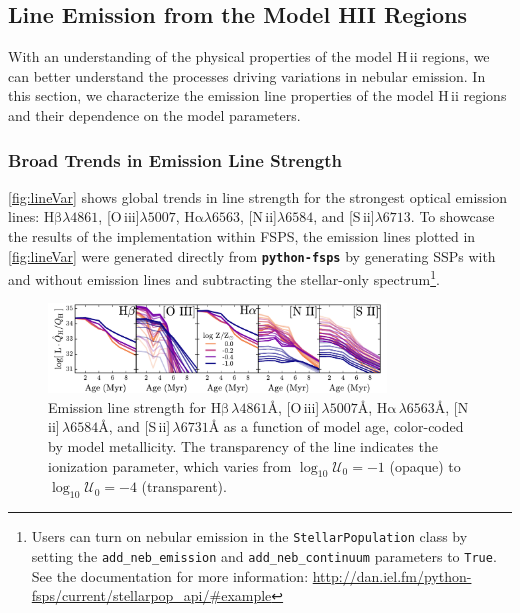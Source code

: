 \documentclass[twocolumn, tighten]{aastex61}
\newcommand{\Fig}[1]{\autoref{fig:#1}}
\newcommand{\FSPS}{{\sc FSPS}\xspace}
\newcommand{\pFSPS}{{\tt \textbf{python-fsps}}\xspace}
\newcommand{\logten}{\ensuremath{\log_{10}}}
\newcommand{\nii}{[N\,{\sc ii}]\xspace}
\newcommand{\sii}{[S\,{\sc ii}]\xspace}
\newcommand{\oiii}{[O\,{\sc iii}]\xspace}
\newcommand{\ha}{\ensuremath{\mathrm{H\alpha}}}
\newcommand{\hb}{\ensuremath{\mathrm{H\beta}}}
\newcommand{\hii}{H\,{\sc ii}\xspace}
\newcommand\lam[1]{\ensuremath{\lambda #1}}
\newcommand{\ang}{\ensuremath{\mbox{\AA}}}
\newcommand{\logU}{\ensuremath{\logten \mathcal{U}_0}}
\begin{document}
\subsection{Line Emission from the Model HII Regions}\label{sec:models:lines}

With an understanding of the physical properties of the model \hii regions, we can better understand the processes driving variations in nebular emission. In this section, we characterize the emission line properties of the model \hii regions and their dependence on the model parameters. 

\subsubsection{Broad Trends in Emission Line Strength}\label{sec:models:lines:strength}

\Fig{lineVar} shows global trends in line strength for the strongest optical emission lines: \hb{}\lam{4861}, \oiii{}\lam{5007}, \ha{}\lam{6563}, \nii{}\lam{6584}, and \sii{}\lam{6713}. To showcase the results of the implementation within \FSPS, the emission lines plotted in \Fig{lineVar} were generated directly from \pFSPS by generating SSPs with and without emission lines and subtracting the stellar-only spectrum\footnote{Users can turn on nebular emission in the {\tt StellarPopulation} class by setting the {\tt add\_neb\_emission} and {\tt add\_neb\_continuum} parameters to {\tt True}. See the documentation for more information: \url{http://dan.iel.fm/python-fsps/current/stellarpop_api/\#example} }.

\begin{figure}
  \begin{centering}
    \includegraphics[width=0.8\textwidth]{f13.pdf}
    \caption{Emission line strength for \hb{}$\,\lambda4861\ang$, \oiii{}$\,\lambda5007\ang$, \ha{}$\,\lambda6563\ang$, \nii{}$\,\lambda6584\ang$, and \sii{}$\,\lambda6731\ang$ as a function of model age, color-coded by model metallicity. The transparency of the line indicates the ionization parameter, which varies from $\logU{}=-1$ (opaque) to $\logU{}=-4$ (transparent).}
    \label{fig:lineVar}
  \end{centering}
\end{figure}
\end{document}

